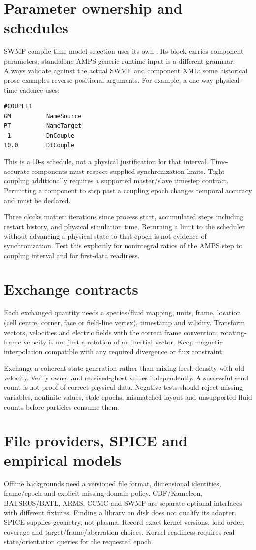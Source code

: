 \section{Parameter ownership and schedules}
SWMF compile-time model selection uses its own .
Its  block carries component parameters; standalone
AMPS generic runtime input is a different grammar.
Always validate against the actual SWMF  and component XML:
some historical prose examples reverse positional arguments.
For example, a one-way physical-time cadence uses:
\begin{lstlisting}
#COUPLE1
GM          NameSource
PT          NameTarget
-1          DnCouple
10.0        DtCouple
\end{lstlisting}
This is a 10-s schedule, not a physical justification for that interval.
Time-accurate components must respect supplied synchronization limits.
Tight coupling additionally requires a supported master/slave timestep
contract. Permitting a component to step past a coupling epoch changes
temporal accuracy and must be declared.

Three clocks matter: iterations since process start, accumulated steps
including restart history, and physical simulation time. Returning a limit
to the scheduler without advancing a physical state to that epoch is not
evidence of synchronization. Test this explicitly for nonintegral ratios of
the AMPS step to coupling interval and for first-data readiness.

\section{Exchange contracts}
Each exchanged quantity needs a species/fluid mapping, units, frame,
location (cell centre, corner, face or field-line vertex), timestamp and
validity. Transform vectors, velocities and electric fields with the
correct frame convention; rotating-frame velocity is not just a rotation
of an inertial vector. Keep magnetic interpolation compatible with any
required divergence or flux constraint.

Exchange a coherent state generation rather than mixing fresh density with
old velocity. Verify owner and received-ghost values independently. A
successful send count is not proof of correct physical data. Negative tests
should reject missing variables, nonfinite values, stale epochs, mismatched
layout and unsupported fluid counts before particles consume them.

\section{File providers, SPICE and empirical models}
Offline backgrounds need a versioned file format, dimensional identities,
frame/epoch and explicit missing-domain policy. CDF/Kameleon, BATSRUS/BATL,
ARMS, CCMC and SWMF are separate optional interfaces with different fixtures.
Finding a library on disk does not qualify its adapter.
SPICE supplies geometry, not plasma. Record exact kernel versions, load order,
coverage and target/frame/aberration choices. Kernel readiness requires real
state/orientation queries for the requested epoch.

